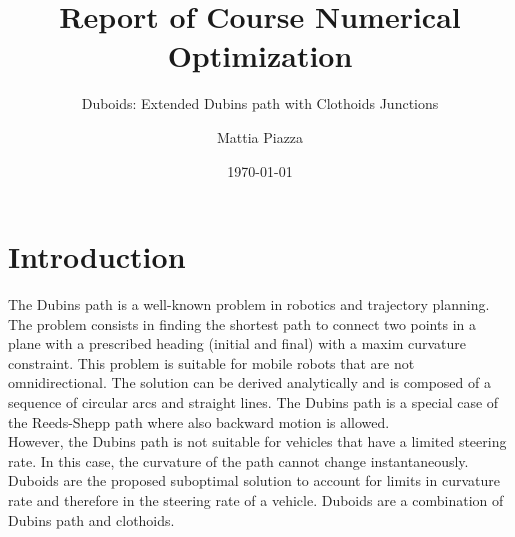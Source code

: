 \documentclass[11pt,twocolumn]{scrartcl}
\title{Report of Course Numerical Optimization}
\subtitle{Duboids: Extended Dubins path with Clothoids Junctions}
\author{Mattia Piazza}
\date{\today}
\begin{document}
%
\twocolumn[\maketitle ]
%
\section*{Introduction}
%
The Dubins path is a well-known problem in robotics and trajectory planning. The problem consists in finding the shortest path to connect two points in a plane with a prescribed heading (initial and final) with a maxim curvature constraint. This problem is suitable for mobile robots that are not omnidirectional. The solution can be derived analytically and is composed of a sequence of circular arcs and straight lines.\cite{shkel2001classification,chen2019shortest,jha2020shortest} The Dubins path is a special case of the Reeds-Shepp path\cite{duits2018optimal} where also backward motion is allowed.\\
However, the Dubins path is not suitable for vehicles that have a limited steering rate. In this case, the curvature of the path cannot change instantaneously.\\
Duboids are the proposed suboptimal solution to account for limits in curvature rate and therefore in the steering rate of a vehicle. Duboids are a combination of Dubins path and clothoids. 
%
\end{document}
